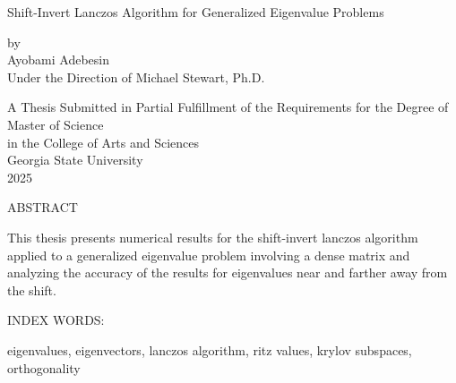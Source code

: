 \pagestyle{empty}
\begin{center}
Shift-Invert Lanczos Algorithm for Generalized Eigenvalue Problems

\vspace{.9in}
by\\
\vspace{.9in}
Ayobami Adebesin\\
\vspace{.9in}
Under the Direction of Michael Stewart, Ph.D. \\
\vspace{2in}

A Thesis Submitted in Partial Fulfillment of the Requirements for the Degree of\\  %
\vspace{.2in}
Master of Science \\
\vspace{.2in}
in the College of Arts and Sciences \\
\vspace{.2in}
Georgia State University \\
\vspace{.2in}
2025
\pagebreak 



ABSTRACT\\
\bigskip
\end{center}

This thesis presents numerical results for the shift-invert lanczos algorithm applied to a generalized eigenvalue problem involving a dense matrix and analyzing the accuracy of the results for eigenvalues near and farther away from the shift.

\begin{singlespace}
\vspace{0.5in}
\noindent INDEX WORDS:
\hspace{0.2in}
\parbox[t]{4.5in}{
eigenvalues, eigenvectors, lanczos algorithm, ritz values, krylov subspaces, orthogonality}
\end{singlespace} 